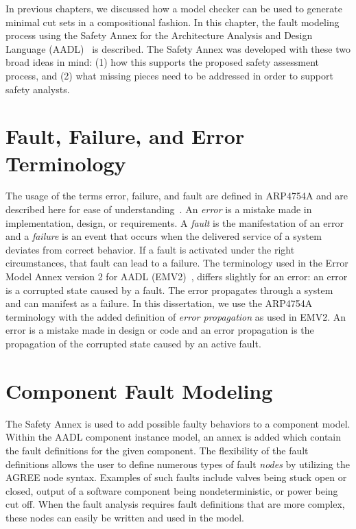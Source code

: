 In previous chapters, we discussed how a model checker can be used to generate minimal cut sets in a compositional fashion. In this chapter, the fault modeling process using the Safety Annex for the Architecture Analysis and Design Language (AADL)~\cite{AADL_Standard} is described. The Safety Annex was developed with these two broad ideas in mind: (1) how this supports the proposed safety assessment process, and (2) what missing pieces need to be addressed in order to support safety analysts. 

\section{Fault, Failure, and Error Terminology}
The usage of the terms error, failure, and fault are defined in ARP4754A and are described here for ease of understanding~\cite{SAE:ARP4754A}. An \textit{error} is a mistake made in implementation, design, or requirements. A \textit{fault} is the manifestation of an error and a \textit{failure} is an event that occurs when the delivered service of a system deviates from correct behavior. If a fault is activated under the right circumstances, that fault can lead to a failure. The terminology used in the Error Model Annex version 2 for AADL (EMV2)~\cite{EMV2}, differs slightly for an error: an error is a corrupted state caused by a fault. The error propagates through a system and can manifest as a failure. In this dissertation, we use the ARP4754A terminology with the added definition of \textit{error propagation} as used in EMV2. An error is a mistake made in design or code and an error propagation is the propagation of the corrupted state caused by an active fault. 

\section{Component Fault Modeling}
The Safety Annex is used to add possible faulty behaviors to a component model. Within the AADL component instance model, an annex is added which contain the fault definitions for the given component. The flexibility of the fault definitions allows the user to define numerous types of fault \textit{nodes} by utilizing the AGREE node syntax. %
Examples of such faults include valves being stuck open or closed, output of a software component being nondeterministic, or power being cut off.  When the fault analysis requires fault definitions that are more complex, these nodes can easily be written and used in the model. 

